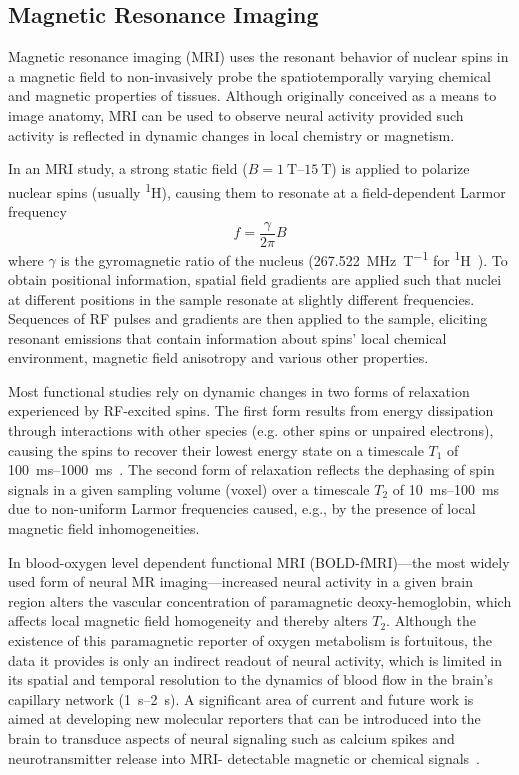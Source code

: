\subsection{Magnetic Resonance Imaging}

Magnetic resonance imaging (MRI) uses the resonant behavior of nuclear spins in a magnetic field to non-invasively probe the spatiotemporally varying chemical and magnetic properties of tissues.
Although originally conceived as a means to image anatomy, MRI can be used to observe neural activity provided such activity is reflected in dynamic changes in local chemistry or magnetism.

In an MRI study, a strong static field ($B = \SIrange{1}{15}{\tesla}$) is applied to polarize nuclear spins (usually \textsuperscript{1}H), causing them to resonate at a field-dependent Larmor frequency \[f = \frac{\gamma}{2\pi} B\] where $\gamma$ is the gyromagnetic ratio of the nucleus (\SI{267.522}{\mega\hertz\per\tesla} for \textsuperscript{1}H~\cite{codata10}).
To obtain positional information, spatial field gradients are applied such that nuclei at different positions in the sample resonate at slightly different frequencies.
Sequences of RF pulses and gradients are then applied to the sample, eliciting resonant emissions that contain information about spins' local chemical environment, magnetic field anisotropy and various other properties.

Most functional studies rely on dynamic changes in two forms of relaxation experienced by RF-excited spins.
The first form results from energy dissipation through interactions with other species (e.g. other spins or unpaired electrons), causing the spins to recover their lowest energy state on a timescale $T_1$ of \SIrange{100}{1000}{\milli\second}~\cite{rooney07}.
The second form of relaxation reflects the dephasing of spin signals in a given sampling volume (voxel) over a timescale $T_2$ of \SIrange{10}{100}{\milli\second}~\cite{deichmann95} due to non-uniform Larmor frequencies caused, e.g., by the presence of local magnetic field inhomogeneities.

In blood-oxygen level dependent functional MRI (BOLD-fMRI)---the most widely used form of neural MR imaging---increased neural activity in a given brain region alters the vascular concentration of paramagnetic deoxy-hemoglobin, which affects local magnetic field homogeneity and thereby alters $T_2$.
Although the existence of this paramagnetic reporter of oxygen metabolism is fortuitous, the data it provides is only an indirect readout of neural activity, which is limited in its spatial and temporal resolution to the dynamics of blood flow in the brain's capillary network (\SIrange{1}{2}{\second}).
A significant area of current and future work is aimed at developing new molecular reporters that can be introduced into the brain to transduce aspects of neural signaling such as calcium spikes and neurotransmitter release into MRI- detectable magnetic or chemical signals~\cite{shapiro10,koretsky12,hsieh12}.

